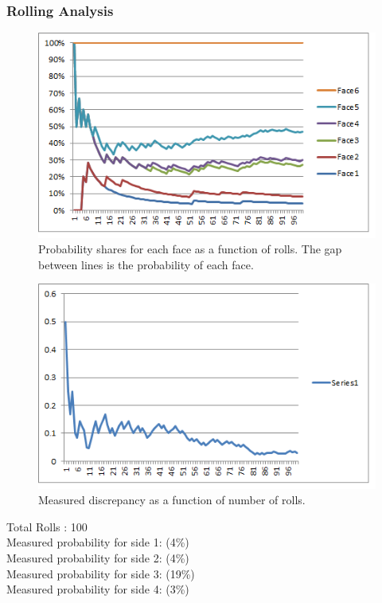 \subsubsection{Rolling Analysis}
\begin{figure}[h]
\center
\includegraphics[scale=1]{pyramid6_graph.png}
\caption{Probability shares for each face as a function of rolls. The gap between lines is the probability of each face.}
\label{fig:pyrg}
\end{figure}
\begin{figure}[h]
\center
\includegraphics[scale=1]{pyramid6_di.png}
\caption{Measured discrepancy as a function of number of rolls.}
\label{fig:pyrd}
\end{figure}
Total Rolls : 100\\
Measured probability for side 1: (4\%)\\
Measured probability for side 2: (4\%)\\
Measured probability for side 3: (19\%)\\
Measured probability for side 4: (3\%)\\
